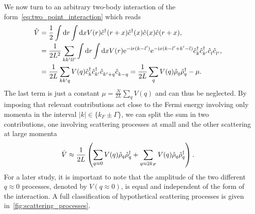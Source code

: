 We now turn to an arbitrary two-body interaction of the form~\cref{eq:two_point_interaction} which reads
\begin{align}
    \hat V
    &= \frac12\int\rd r\int\rd x V(r)\hat c^\dag(r+x)\hat c^\dag(x)\hat c^\pdag(x)\hat c^\pdag(r+x),
    \\
    &= \frac1{2L^2}\sum_{kk'll'}\int\rd r\int\rd x V(r)\re^{-\ri r(k-l')}\re^{-\ri x(k-l'+k'-l)}\hat c^\dag_k\hat c^\dag_{k'}\hat c^\pdag_l\hat c^\pdag_{l'},
    \\
    &= \frac1{2L}\sum_{kk'q}V(q)\hat c^\dag_k\hat c^\dag_{k'}\hat c^\pdag_{k'+q}\hat c^\pdag_{k-q}
    = \frac1{2L}\sum_{q}V(q)\hat\rho_q\hat\rho^\dag_{q} - \mu.
    \label{eq:two_body_interaction_momentum_space}
\end{align}
The last term is just a constant $\mu = \frac N{2L}\sum_qV(q)$ and can thus be neglected.
By imposing that relevant contributions act close to the Fermi energy involving only momenta in the interval $|k|\in\{k_F\pm\Gamma\}$, we can split the sum in two contributions, one involving scattering processes at small and the other scattering at large momenta
\begin{align}
    \hat V \approx \frac1{2L}\left( \sum_{q\approx0}V(q)\hat\rho_{q}\hat\rho^\dag_{q} + \sum_{q\approx2k_F}V(q)\hat\rho_{q}\hat\rho^\dag_{q} \right).
\end{align}
For a later study, it is important to note that the amplitude of the two different $q\approx0$ processes, denoted by $V(q\approx0)$, is equal and independent of the form of the interaction.
A full classification of hypothetical scattering processes is given in~\cref{fig:scattering_processes}.
